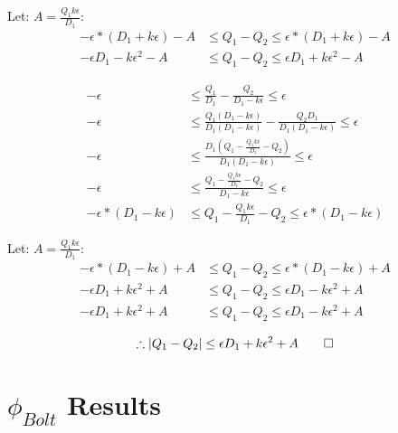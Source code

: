 \documentclass[11pt]{amsart}
\begin{document}
Let: $A = \frac{Q_1 k \epsilon}{D_1}$:
\begin{align*}
-\epsilon*(D_1 + k \epsilon) - A &\leq Q_1 - Q_2 \leq \epsilon*(D_1 + k \epsilon) - A \\
-\epsilon D_1 - k \epsilon^2 - A &\leq Q_1 - Q_2 \leq \epsilon D_1 + k \epsilon^2 - A
\end{align*}


\encircle{-}
\begin{align*}
-\epsilon &\leq \frac{Q_1}{D_1} - \frac{Q_2}{D_1 - k\epsilon} \leq \epsilon \\
-\epsilon &\leq \frac{Q_1 (D_1 - k\epsilon)}{D_1(D_1 - k\epsilon)} - \frac{Q_2 D_1}{D_1 (D_1 - k\epsilon)} \leq \epsilon \\
-\epsilon &\leq \frac{D_1 (Q_1 - \frac{Q_1 k \epsilon}{D_1} - Q_2)}{D_1 (D_1 - k \epsilon)} \leq \epsilon \\
-\epsilon &\leq \frac{Q_1 - \frac{Q_1 k \epsilon}{D_1} - Q_2}{D_1 - k \epsilon} \leq \epsilon \\
-\epsilon*(D_1 - k \epsilon) &\leq Q_1 - \frac{Q_1 k \epsilon}{D_1} - Q_2 \leq \epsilon*(D_1 - k \epsilon)
\end{align*}

Let: $A = \frac{Q_1 k \epsilon}{D_1}$:
\begin{align*}
-\epsilon*(D_1 - k \epsilon) + A &\leq Q_1 - Q_2 \leq \epsilon*(D_1 - k \epsilon) + A \\
-\epsilon D_1 + k \epsilon^2 + A &\leq Q_1 - Q_2 \leq \epsilon D_1 - k \epsilon^2 + A \\
-\epsilon D_1 + k \epsilon^2 + A &\leq Q_1 - Q_2 \leq \epsilon D_1 - k \epsilon^2 + A
\end{align*}

\begin{equation}
\therefore |Q_1 - Q_2| \leq \epsilon D_1 + k \epsilon^2 + A \qed
\end{equation}



\newpage
\section{$\phi_{Bolt}$ Results}






\newpage
{}



\newpage

\end{document}
